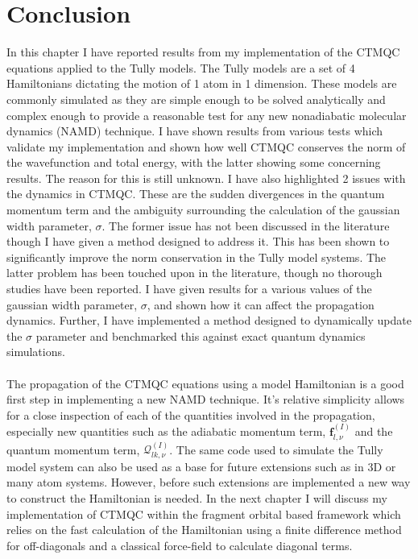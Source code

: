 \section{Conclusion}
In this chapter I have reported results from my implementation of the CTMQC equations applied to the Tully models. The Tully models are a set of 4 Hamiltonians dictating the motion of 1 atom in 1 dimension. These models are commonly simulated as they are simple enough to be solved analytically and complex enough to provide a reasonable test for any new nonadiabatic molecular dynamics (NAMD) technique. I have shown results from various tests which validate my implementation and shown how well CTMQC conserves the norm of the wavefunction and total energy, with the latter showing some concerning results. The reason for this is still unknown. I have also highlighted 2 issues with the dynamics in CTMQC. These are the sudden divergences in the quantum momentum term and the ambiguity surrounding the calculation of the gaussian width parameter, $\sigma$. The former issue has not been discussed in the literature  though I have given a method designed to address it. This has been shown to significantly improve the norm conservation in the Tully model systems. The latter problem has been touched upon in the literature, though no thorough studies have been reported. I have given results for a various values of the gaussian width parameter, $\sigma$, and shown how it can affect the propagation dynamics. Further, I have implemented a method designed to dynamically update the $\sigma$ parameter and benchmarked this against exact quantum dynamics simulations.
\\\\
The propagation of the CTMQC equations using a model Hamiltonian is a good first step in implementing a new NAMD technique. It's relative simplicity allows for a close inspection of each of the quantities involved in the propagation, especially new quantities such as the adiabatic momentum term, $\mathbf{f}_{l, \nu}^{(I)}$ and the quantum momentum term, $\mathcal{Q}_{lk, \nu}^{(I)}$. The same code used to simulate the Tully model system can also be used as a base for future extensions such as in 3D or many atom systems. However, before such extensions are implemented a new way to construct the Hamiltonian is needed. In the next chapter I will discuss my implementation of CTMQC within the fragment orbital based framework which relies on the fast calculation of the Hamiltonian using a finite difference method for off-diagonals and a classical force-field to calculate diagonal terms. 



